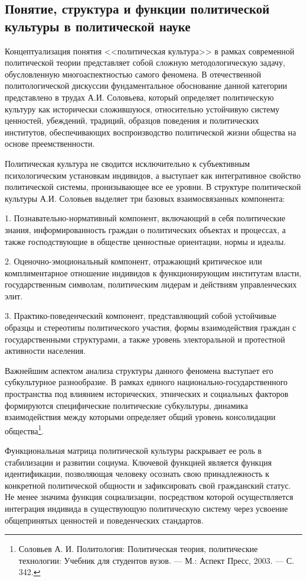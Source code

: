 \subsection{Понятие, структура и функции политической культуры в политической науке}

Концептуализация понятия <<политическая культура>> в рамках современной политической теории представляет собой сложную методологическую задачу, обусловленную многоаспектностью самого феномена. В отечественной политологической дискуссии фундаментальное обоснование данной категории представлено в трудах А.И. Соловьева, который определяет политическую культуру как исторически сложившуюся, относительно устойчивую систему ценностей, убеждений, традиций, образцов поведения и политических институтов, обеспечивающих воспроизводство политической жизни общества на основе преемственности.

Политическая культура не сводится исключительно к субъективным психологическим установкам индивидов, а выступает как интегративное свойство политической системы, пронизывающее все ее уровни. В структуре политической культуры А.И. Соловьев выделяет три базовых взаимосвязанных компонента:

1. Познавательно-нормативный компонент, включающий в себя политические знания, информированность граждан о политических объектах и процессах, а также господствующие в обществе ценностные ориентации, нормы и идеалы.

2. Оценочно-эмоциональный компонент, отражающий критическое или комплиментарное отношение индивидов к функционирующим институтам власти, государственным символам, политическим лидерам и действиям управленческих элит.

3. Практико-поведенческий компонент, представляющий собой устойчивые образцы и стереотипы политического участия, формы взаимодействия граждан с государственными структурами, а также уровень электоральной и протестной активности населения.

Важнейшим аспектом анализа структуры данного феномена выступает его субкультурное разнообразие. В рамках единого национально-государственного пространства под влиянием исторических, этнических и социальных факторов формируются специфические политические субкультуры, динамика взаимодействия между которыми определяет общий уровень консолидации общества\footnote{Соловьев А. И. Политология: Политическая теория, политические технологии: Учебник для студентов вузов. --- М.: Аспект Пресс, 2003. --- С. 342.}.

Функциональная матрица политической культуры раскрывает ее роль в стабилизации и развитии социума. Ключевой функцией является функция идентификации, позволяющая человеку осознать свою принадлежность к конкретной политической общности и зафиксировать свой гражданский статус. Не менее значима функция социализации, посредством которой осуществляется интеграция индивида в существующую политическую систему через усвоение общепринятых ценностей и поведенческих стандартов. 


